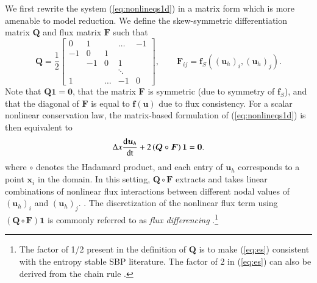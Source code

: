 \documentclass[preprint,10pt]{elsarticle}
\theoremstyle{definition}
\theoremstyle{lemma}
\theoremstyle{theorem}
\theoremstyle{assumption}
\newcommand{\td}[2]{\frac{{\rm d}#1}{{\rm d}{\rm #2}}}
\newcommand{\LRp}[1]{\left( #1 \right)}
\newcommand{\bnote}[1]{{\color{blue}{#1}}}
\newcommand{\rnote}[1]{{\color{red}{#1}}}
\begin{document}
We first rewrite the system (\ref{eq:nonlineqs1d}) in a matrix form which is more amenable to model reduction.  We define the skew-symmetric differentiation matrix $\bm{Q}$ and flux matrix $\bm{F}$ such that
\begin{equation}
\bm{Q} = \frac{1}{2}\begin{bmatrix}
0 & 1 & &\ldots & -1\\
-1 & 0 & 1 &&  \\
& -1 & 0 & 1 &  \\
 & & & \ddots &  \\
1 & &\ldots  & -1 & 0
\end{bmatrix}, \qquad \bm{F}_{ij} = \bm{f}_{S}\LRp{\LRp{\bm{u}_h}_i, \LRp{\bm{u}_h}_j}.
\label{eq:Qmat}
\end{equation}
\bnote{Let $\bm{1}$ denote the vector of all ones.}  Note that $\bm{Q}\bm{1} = \bm{0}$, that the matrix $\bm{F}$ is symmetric (due to symmetry of $\bm{f}_S$), and that the diagonal of $\bm{F}$ is equal to $\bm{f}(\bm{u})$ due to flux consistency.  For a scalar nonlinear conservation law, the matrix-based formulation of (\ref{eq:nonlineqs1d}) is then equivalent to
\begin{align}
\Delta x \td{\bm{u}_h}{t} + 2\LRp{{\bm{Q}}\circ \bm{F}}\bm{1} = \bm{0}.
\label{eq:es}
\end{align}
where $\circ$ denotes the Hadamard product, and each entry of $\bm{u}_h$ corresponds to a point $\bm{x}_i$ in the domain.  In this setting, $\bm{Q}\circ\bm{F}$ extracts and takes linear combinations of nonlinear flux interactions between different nodal values of $(\bm{u}_h)_i$ and $(\bm{u}_h)_j$.  \rnote{We note that this reformulation using the Hadamard product is non-standard within the finite volume literature, but is more common in the SBP finite difference literature}.  The discretization of the nonlinear flux term using $\LRp{\bm{Q}\circ \bm{F}}\bm{1}$ is commonly referred to as \textit{flux differencing} \cite{carpenter2014entropy, gassner2016split, chen2017entropy, crean2018entropy, chan2017discretely}.\footnote{The factor of 1/2 present in the definition of $\bm{Q}$ is to make (\ref{eq:es}) consistent with the entropy stable SBP literature.  The factor of 2 in (\ref{eq:es}) can also be derived from the chain rule \cite{chen2017entropy, crean2018entropy}.}  
\end{document}
